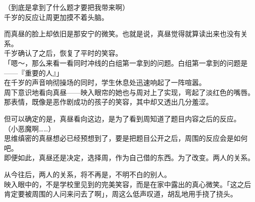 （到底是拿到了什么题才要把我带来啊）\\

千岁的反应让周更加摸不着头脑。

而真昼的脸上却依旧是那安宁的微笑。也就是说，真昼觉得就算读出来也没有关系。\\

千岁确认了之后，恢复了平时的笑容。\\

「嗯～，那么来看一看同时冲线的白组第一拿到的问题。白组第一拿到的问题是——『重要的人』」\\

在千岁的声音响彻操场的同时，学生休息处迅速响起了一阵喧嚣。\\

周下意识地看向真昼——映入眼帘的她也与周对上了实现，弯起了淡红色的嘴唇。\\

那表情，既像是恶作剧成功的孩子的笑容，其中却又透出几分羞涩。

但可以确定的是，真昼看向这边，是为了看到周知道了题目内容之后的反应。\\

（小恶魔啊……）\\

思维缜密的真昼想必已经预想到了，要是把题目公开之后，周围的反应会是如何吧。\\

即便如此，真昼还是决定，选择周，作为自己借的东西。为了改变。两人的关系。

从今往后，两人的关系，将不再是，不明不白的别人。\\

映入眼中的，不是学校里见到的完美笑容，而是在家中露出的真心微笑。「这之后肯定要被周围的人问来问去了啊」，周这么低声叹道，胡乱地用手挠了挠头。
